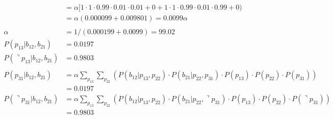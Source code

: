 \documentclass[letterpaper, 12pt]{artikel3}
\begin{document}
\begin{align*}
& = \alpha [1 \cdot 1  \cdot 0.99 \cdot 0.01 \cdot 0.01 + 0 + 1\cdot 1\cdot 0.99 \cdot 0.01 \cdot 0.99 + 0)   \\
& =\alpha (0.000099 + 0.009801) =  0.0099\alpha  \\
\\
\alpha &= 1/(0.000199 +0.0099) = 99.02\\
P( p_{13}| b_{12},b_{21}) &= 0.0197\\
P(\urcorner p_{13}| b_{12},b_{21}) &= 0.9803\\
\\
P(p_{31}| b_{12},b_{21}) &=\alpha \sum_{p_{13}} \sum_{p_{22}}(P(b_{12}|p_{13},p_{22}) \cdot P(b_{21}|p_{22},p_{31})\cdot P(p_{13}) \cdot P(p_{22}) \cdot P(p_{31}) )  \\
&=  0.0197\\
P(\urcorner p_{31}| b_{12},b_{21}) &=\alpha \sum_{p_{13}} \sum_{p_{22}}(P(b_{12}|p_{13},p_{22}) \cdot P(b_{21}|p_{22},\urcorner p_{31})\cdot P(p_{13}) \cdot P(p_{22}) \cdot P ( \urcorner p_{31}) ) \\
&= 0.9803 \\
\end{align*}
\end{document}

